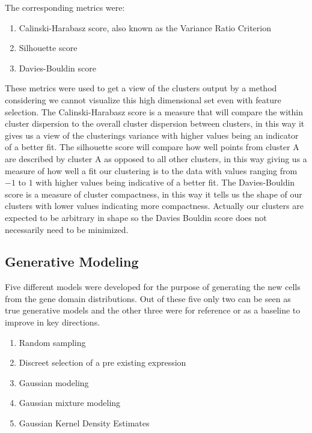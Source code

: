 \documentclass[12pt, a4paper]{article}
\begin{document}
\begin{multicols}{2}
                The corresponding metrics were:

                \begin{enumerate}
                    \item Calinski-Harabasz score, also known as the Variance Ratio Criterion \cite{calinski_dendrite_1974}
                    \item Silhouette score \cite{rousseeuw_silhouettes_1987}
                    \item Davies-Bouldin score \cite{davies_cluster_1979}
                \end{enumerate}

                These metrics were used to get a view of the clusters output by a method considering we cannot visualize this high dimensional set even with feature selection. The Calinski-Harabasz score is a measure that will compare the within cluster dispersion to the overall cluster dispersion between clusters, in this way it gives us a view of the clusterings variance with higher values being an indicator of a better fit. The silhouette score will compare how well points from cluster A are described by cluster A as opposed to all other clusters, in this way giving us a measure of how well a fit our clustering is to the data with values ranging from $-1$ to $1$ with higher values being indicative of a better fit. The Davies-Bouldin score is a measure of cluster compactness, in this way it tells us the shape of our clusters with lower values indicating more compactness. Actually our clusters are expected to be arbitrary in shape so the Davies Bouldin score does not necessarily need to be minimized.
                \newline


            \subsection{Generative Modeling}\label{sub:Generative Modeling} %

                Five different models were developed for the purpose of generating the new cells from the gene domain distributions. Out of these five only two can be seen as true generative models and the other three were for reference or as a baseline to improve in key directions.
                \newline

                \begin{enumerate}
                    \item Random sampling
                    \item Discreet selection of a pre existing expression
                    \item Gaussian modeling
                    \item Gaussian mixture modeling
                    \item Gaussian Kernel Density Estimates
                \end{enumerate}


\end{multicols}
\end{document}
